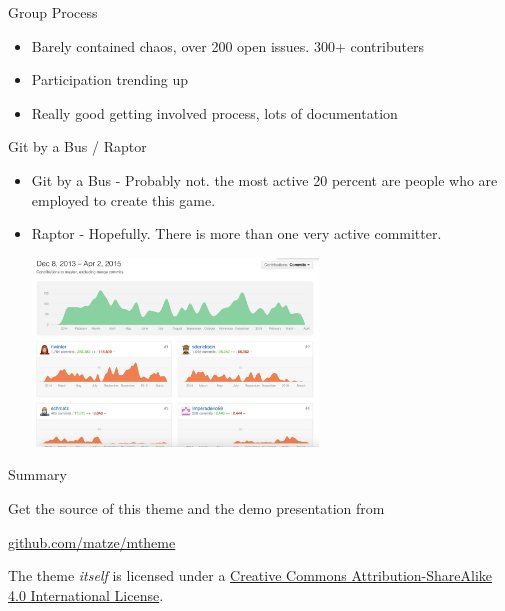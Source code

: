 \documentclass[10pt, compress]{beamer}
\begin{document}
\begin{frame}{Group Process}
    \begin{itemize}
    \item Barely contained chaos, over 200 open issues. 300+ contributers
    \item Participation trending up
    \item Really good getting involved process, lots of documentation
    \end{itemize}
    
\end{frame}

\begin{frame}{Git by a Bus / Raptor}
    \begin{itemize}
    \item Git by a Bus - Probably not. the most active 20 percent are people who are employed to create this game. 
    \item Raptor - Hopefully. There is more than one very active committer. 
    \centerline{\includegraphics[width=\textwidth, height=5cm, keepaspectratio]{images/graph.png}}
    
    \end{itemize}
    
\end{frame}

\begin{frame}{Summary}

  Get the source of this theme and the demo presentation from

  \begin{center}\url{github.com/matze/mtheme}\end{center}

  The theme \emph{itself} is licensed under a
  \href{http://creativecommons.org/licenses/by-sa/4.0/}{Creative Commons
  Attribution-ShareAlike 4.0 International License}.

  \begin{center}\ccbysa\end{center}

\end{frame}

\end{document}
